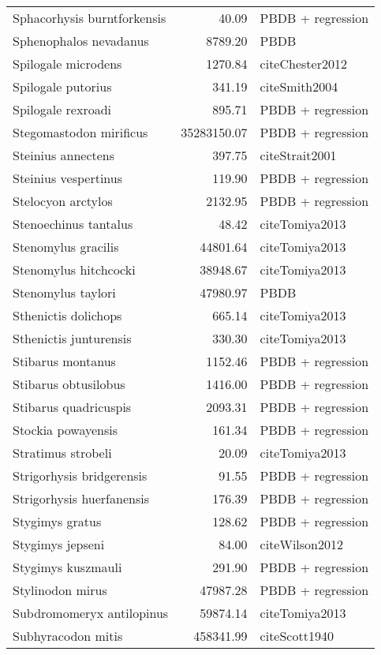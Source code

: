 \begin{table}[ht]
\begin{tabular}{lrl}
  Sphacorhysis burntforkensis & 40.09 & PBDB + regression \\ 
  Sphenophalos nevadanus & 8789.20 & PBDB \\ 
  Spilogale microdens & 1270.84 & cite{Chester2012} \\ 
  Spilogale putorius & 341.19 & cite{Smith2004} \\ 
  Spilogale rexroadi & 895.71 & PBDB + regression \\ 
  Stegomastodon mirificus & 35283150.07 & PBDB + regression \\ 
  Steinius annectens & 397.75 & cite{Strait2001} \\ 
  Steinius vespertinus & 119.90 & PBDB + regression \\ 
  Stelocyon arctylos & 2132.95 & PBDB + regression \\ 
  Stenoechinus tantalus & 48.42 & cite{Tomiya2013} \\ 
  Stenomylus gracilis & 44801.64 & cite{Tomiya2013} \\ 
  Stenomylus hitchcocki & 38948.67 & cite{Tomiya2013} \\ 
  Stenomylus taylori & 47980.97 & PBDB \\ 
  Sthenictis dolichops & 665.14 & cite{Tomiya2013} \\ 
  Sthenictis junturensis & 330.30 & cite{Tomiya2013} \\ 
  Stibarus montanus & 1152.46 & PBDB + regression \\ 
  Stibarus obtusilobus & 1416.00 & PBDB + regression \\ 
  Stibarus quadricuspis & 2093.31 & PBDB + regression \\ 
  Stockia powayensis & 161.34 & PBDB + regression \\ 
  Stratimus strobeli & 20.09 & cite{Tomiya2013} \\ 
  Strigorhysis bridgerensis & 91.55 & PBDB + regression \\ 
  Strigorhysis huerfanensis & 176.39 & PBDB + regression \\ 
  Stygimys gratus & 128.62 & PBDB + regression \\ 
  Stygimys jepseni & 84.00 & cite{Wilson2012} \\ 
  Stygimys kuszmauli & 291.90 & PBDB + regression \\ 
  Stylinodon mirus & 47987.28 & PBDB + regression \\ 
  Subdromomeryx antilopinus & 59874.14 & cite{Tomiya2013} \\ 
  Subhyracodon mitis & 458341.99 & cite{Scott1940} \\ 

\end{tabular}
\end{table}
